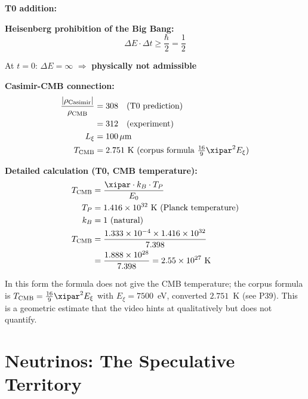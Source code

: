 	\begin{vorteil}
		\textbf{T0 addition:}
		
		\textbf{Heisenberg prohibition of the Big Bang:}
		\begin{equation}
			\Delta E \cdot \Delta t \geq \frac{\hbar}{2} = \frac{1}{2}
		\end{equation}
		
		At $t = 0$: $\Delta E = \infty$ $\Rightarrow$ \textbf{physically not admissible}
		
		\textbf{Casimir-CMB connection:}
		\begin{align}
			\frac{|\rho_{\text{Casimir}}|}{\rho_{\text{CMB}}} &= 308 \quad \text{(T0 prediction)} \\
			&= 312 \quad \text{(experiment)} \\
			L_\xi &= 100 \, \mu\text{m} \\
			T_{\text{CMB}} &= 2.751 \text{ K (corpus formula } \tfrac{16}{9}\xipar^2 E_\xi\text{)}
		\end{align}
		
		\textbf{Detailed calculation (T0, CMB temperature):}
		\begin{align}
			T_{\text{CMB}} &= \frac{\xipar \cdot k_B \cdot T_P}{E_0} \\
			T_P &= 1.416 \times 10^{32} \text{ K (Planck temperature)} \\
			k_B &= 1 \text{ (natural)} \\
			T_{\text{CMB}} &= \frac{1.333 \times 10^{-4} \times 1.416 \times 10^{32}}{7.398} \\
			&= \frac{1.888 \times 10^{28}}{7.398} = 2.55 \times 10^{27} \text{ K}
		\end{align}
		
		In this form the formula does not give the CMB temperature; the corpus formula is $T_{\text{CMB}} = \frac{16}{9}\xipar^2 E_\xi$ with $E_\xi = 7500$~eV, converted $2.751$~K (see P39). This is a geometric estimate that the video hints at qualitatively but does not quantify.
	\end{vorteil}
	
	\section{Neutrinos: The Speculative Territory}
	
